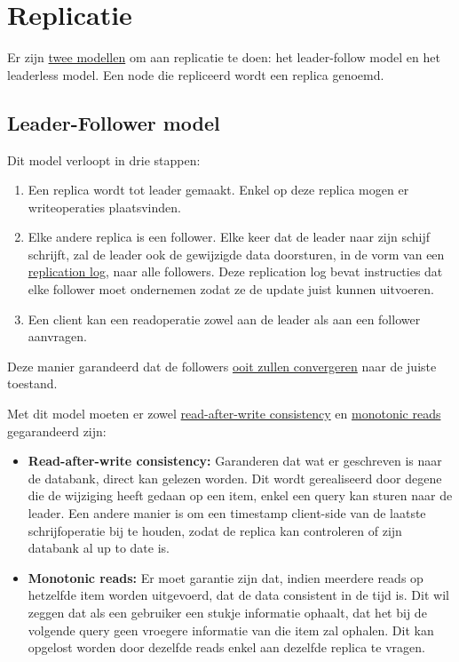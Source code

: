 	\section{Replicatie}
	\label{sec:replicatie}
	Er zijn \underline{twee modellen} om aan replicatie te doen: het leader-follow model en het leaderless model. Een node die repliceerd wordt een replica genoemd.
	\subsection{Leader-Follower model}
	Dit model verloopt in drie stappen:
	\begin{enumerate}
		\item Een replica wordt tot leader gemaakt. Enkel op deze replica mogen er writeoperaties plaatsvinden.
		\item Elke andere replica is een follower. Elke keer dat de leader naar zijn schijf schrijft, zal de leader ook de gewijzigde data doorsturen, in de vorm van een \underline{replication log}, naar alle followers. Deze replication log bevat instructies dat elke follower moet ondernemen zodat ze de update juist kunnen uitvoeren.
		\item Een client kan een readoperatie zowel aan de leader als aan een follower aanvragen. 
	\end{enumerate}
	Deze manier garandeerd dat de followers \underline{ooit zullen convergeren} naar de juiste toestand.

	Met dit model moeten er zowel \underline{read-after-write consistency} en \underline{monotonic reads} gegarandeerd zijn:
	\begin{itemize}
		\item  \textbf{Read-after-write consistency:} Garanderen dat wat er geschreven is naar de databank, direct kan gelezen worden. Dit wordt gerealiseerd door degene die de wijziging heeft gedaan op een item, enkel een query kan sturen naar de leader. Een andere manier is om een timestamp client-side van de laatste schrijfoperatie bij te houden, zodat de replica kan controleren of zijn databank al up to date is.

		\item  \textbf{Monotonic reads:} Er moet garantie zijn dat, indien meerdere reads op hetzelfde item worden uitgevoerd, dat de data consistent in de tijd is. Dit wil zeggen dat als een gebruiker een stukje informatie ophaalt, dat het bij de volgende query geen vroegere informatie van die item zal ophalen. Dit kan opgelost worden door dezelfde reads enkel aan dezelfde replica te vragen.
	\end{itemize}
